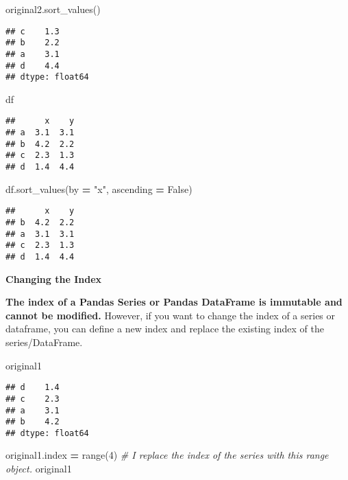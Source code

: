 \documentclass[
]{book}
\newenvironment{Shaded}{\begin{snugshade}}{\end{snugshade}}
\newcommand{\BuiltInTok}[1]{#1}
\newcommand{\CommentTok}[1]{\textcolor[rgb]{0.56,0.35,0.01}{\textit{#1}}}
\newcommand{\DecValTok}[1]{\textcolor[rgb]{0.00,0.00,0.81}{#1}}
\newcommand{\NormalTok}[1]{#1}
\newcommand{\OperatorTok}[1]{\textcolor[rgb]{0.81,0.36,0.00}{\textbf{#1}}}
\newcommand{\StringTok}[1]{\textcolor[rgb]{0.31,0.60,0.02}{#1}}
\newcommand{\VariableTok}[1]{\textcolor[rgb]{0.00,0.00,0.00}{#1}}
\begin{document}
\begin{Shaded}
\begin{Highlighting}[]
\NormalTok{original2.sort\_values()}
\end{Highlighting}
\end{Shaded}

\begin{verbatim}
## c    1.3
## b    2.2
## a    3.1
## d    4.4
## dtype: float64
\end{verbatim}

\begin{Shaded}
\begin{Highlighting}[]
\NormalTok{df}
\end{Highlighting}
\end{Shaded}

\begin{verbatim}
##      x    y
## a  3.1  3.1
## b  4.2  2.2
## c  2.3  1.3
## d  1.4  4.4
\end{verbatim}

\begin{Shaded}
\begin{Highlighting}[]
\NormalTok{df.sort\_values(by }\OperatorTok{=} \StringTok{"x"}\NormalTok{, ascending }\OperatorTok{=} \VariableTok{False}\NormalTok{)}
\end{Highlighting}
\end{Shaded}

\begin{verbatim}
##      x    y
## b  4.2  2.2
## a  3.1  3.1
## c  2.3  1.3
## d  1.4  4.4
\end{verbatim}

\textbf{Changing the Index}

{\textbf{The index of a Pandas Series or Pandas DataFrame is immutable and cannot be modified.}} However, if you want to change the index of a series or dataframe, you can define a new index and replace the existing index of the series/DataFrame.

\begin{Shaded}
\begin{Highlighting}[]
\NormalTok{original1}
\end{Highlighting}
\end{Shaded}

\begin{verbatim}
## d    1.4
## c    2.3
## a    3.1
## b    4.2
## dtype: float64
\end{verbatim}

\begin{Shaded}
\begin{Highlighting}[]
\NormalTok{original1.index }\OperatorTok{=} \BuiltInTok{range}\NormalTok{(}\DecValTok{4}\NormalTok{) }\CommentTok{\# I replace the index of the series with this range object.}
\NormalTok{original1}
\end{Highlighting}
\end{Shaded}
\end{document}
